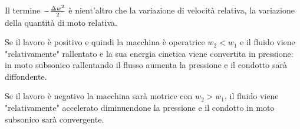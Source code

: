 \documentclass[a4paper, 15pt]{article}
\begin{document}
\begin{adjustwidth}{2in}{}
	Il termine \(-{\Delta w^2\over2}\) è nient'altro che la variazione di velocità relativa, la variazione della quantità di moto relativa. 
	
	Se il lavoro è positivo e quindi la macchina è operatrice $w_2<w_1$ e il fluido viene "relativamente" rallentato e la sua energia cinetica viene convertita in pressione: in moto subsonico rallentando il flusso aumenta la pressione e il condotto sarà diffondente. 
	
	Se il lavoro è negativo la macchina sarà motrice con $w_2>w_1$, il fluido viene "relativamente" accelerato diminuendone la pressione e il condotto in moto subsonico sarà convergente. \newline 
	\end{adjustwidth}
		
\newpage
		
\end{document}
